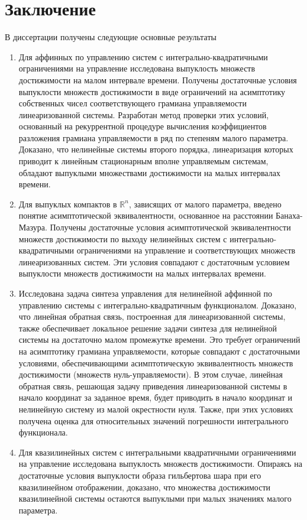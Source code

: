 \documentclass[../main.tex]{subfiles}
\begin{document}
\clearpage
\section*{Заключение}
В диссертации получены следующие основные результаты
\begin{enumerate}
	\item Для аффинных по управлению систем с интегрально-квадратичными ограничениями на управление исследована выпуклость множеств достижимости на малом интервале времени.
	Получены достаточные условия выпуклости множеств достижимости в виде ограничений на асимптотику собственных чисел соответствующего грамиана управляемости линеаризованной системы.
	Разработан метод проверки этих условий, основанный на рекуррентной процедуре вычисления коэффициентов разложения грамиана управляемости в ряд по степеням малого параметра.
	Доказано, что нелинейные системы второго порядка, линеаризация которых приводит к линейным стационарным вполне управляемым системам, обладают выпуклыми множествами достижимости на малых интервалах времени.
	
	\item Для выпуклых компактов в $\mathbb{R}^n$, зависящих от малого параметра, введено понятие асимптотической эквивалентности, основанное на расстоянии Банаха-Мазура.
	Получены достаточные условия асимптотической эквивалентности множеств достижимости по выходу нелинейных систем с интегрально-квадратичными ограничениями на управление и соответствующих множеств линеаризованных систем. 
	Эти условия совпадают с достаточным условием выпуклости множеств достижимости на малых интервалах времени.
	
	\item Исследована задача синтеза управления для нелинейной аффинной по управлению системы с интегрально-квадратичным функционалом. 
	Доказано, что линейная обратная связь, построенная для линеаризованной системы, также обеспечивает локальное решение задачи синтеза для нелинейной системы на достаточно малом промежутке времени. 
	Это требует ограничений на асимптотику грамиана управляемости, которые совпадают с достаточными условиями, обеспечивающими асимптотическую эквивалентность множеств достижимости (множеств нуль-управляемости). 
	В этом случае, линейная обратная связь, решающая задачу приведения линеаризованной системы в начало координат за заданное время, будет приводить в начало координат и нелинейную систему из малой окрестности нуля.
	Также, при этих условиях получена оценка для относительных значений погрешности интегрального функционала. 
	
	\item Для квазилинейных систем с интегральными квадратичными ограничениями на управление исследована выпуклость множеств достижимости. 
	Опираясь на достаточные условия выпуклости образа гильбертова шара при его квазилинейном отображении, доказано, что множества достижимости квазилинейной системы остаются выпуклыми при малых значениях малого параметра. 
\end{enumerate}
\end{document}
